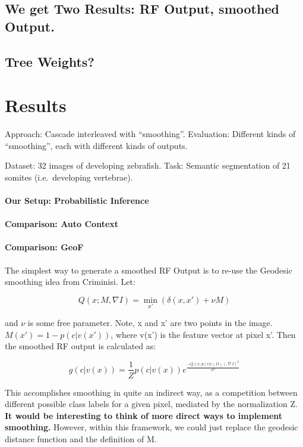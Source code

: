 \documentclass[10pt,twocolumn,letterpaper]{article}
\begin{document}
\subsection{We get Two Results: RF Output, smoothed Output.}

\subsection{Tree Weights?}

\section{Results}
Approach: Cascade interleaved with "`smoothing"'. 
Evaluation: Different kinds of "`smoothing"', each with different kinds of outputs.

Dataset: 32 images of developing zebrafish. Task: Semantic segmentation of 21 somites (i.e.\ developing vertebrae).

\paragraph{Our Setup: Probabilistic Inference}

\paragraph{Comparison: Auto Context}

\paragraph{Comparison: GeoF}
The simplest way to generate a smoothed RF Output is to re-use the Geodesic smoothing idea from Criminisi.  Let:

\[ Q(x; M, \nabla I) = \min_{x'} (\delta (x,x') + \nu M) \]

and $\nu$ is some free parameter.  Note, x and x' are two points in the image. $M(x') = 1 - p(c|v(x'))$, where v(x') is the feature vector at pixel x'.  Then the smoothed RF output is calculated as:

\[ g(c|v(x)) = \frac{1}{Z} p(c|v(x)) e^{\frac{-Q(x;p(c|v(\Omega)),\nabla J)^2}{\sigma ^2}} \]

This accomplishes smoothing in quite an indirect way, as a competition between different possible class labels for a given pixel, mediated by the normalization Z.  \textbf{It would be interesting to think of more direct ways to implement smoothing.}  However, within this framework, we could just replace the geodesic distance function and the definition of M.
\end{document}
